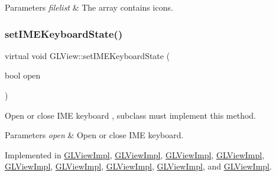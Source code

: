 \begin{DoxyParams}{Parameters}
{\em filelist} & The array contains icons. \\
\hline
\end{DoxyParams}
\mbox{\label{classGLView_aaa70edad9dd4b2052237867db978e06d}} 
\subsubsection{\texorpdfstring{set\+I\+M\+E\+Keyboard\+State()}{setIMEKeyboardState()}\hspace{0.1cm}{\footnotesize\ttfamily [1/2]}}
{\footnotesize\ttfamily virtual void G\+L\+View\+::set\+I\+M\+E\+Keyboard\+State (\begin{DoxyParamCaption}\item[{bool}]{open }\end{DoxyParamCaption})\hspace{0.3cm}{\ttfamily [pure virtual]}}

Open or close I\+ME keyboard , subclass must implement this method.


\begin{DoxyParams}{Parameters}
{\em open} & Open or close I\+ME keyboard. \\
\hline
\end{DoxyParams}


Implemented in \hyperlink{classGLViewImpl_a97c906321e44204249b112de5706a617}{G\+L\+View\+Impl}, \hyperlink{classGLViewImpl_a37e04acaf52f6258ebe98d6b36c3b6c3}{G\+L\+View\+Impl}, \hyperlink{classGLViewImpl_a37e04acaf52f6258ebe98d6b36c3b6c3}{G\+L\+View\+Impl}, \hyperlink{classGLViewImpl_a37e04acaf52f6258ebe98d6b36c3b6c3}{G\+L\+View\+Impl}, \hyperlink{classGLViewImpl_a37e04acaf52f6258ebe98d6b36c3b6c3}{G\+L\+View\+Impl}, \hyperlink{classGLViewImpl_a37e04acaf52f6258ebe98d6b36c3b6c3}{G\+L\+View\+Impl}, \hyperlink{classGLViewImpl_a134389b64b11ebd0af740c9acba58dc9}{G\+L\+View\+Impl}, \hyperlink{classGLViewImpl_a134389b64b11ebd0af740c9acba58dc9}{G\+L\+View\+Impl}, and \hyperlink{classGLViewImpl_a134389b64b11ebd0af740c9acba58dc9}{G\+L\+View\+Impl}.

\mbox{\label{classGLView_aaa70edad9dd4b2052237867db978e06d}} 
